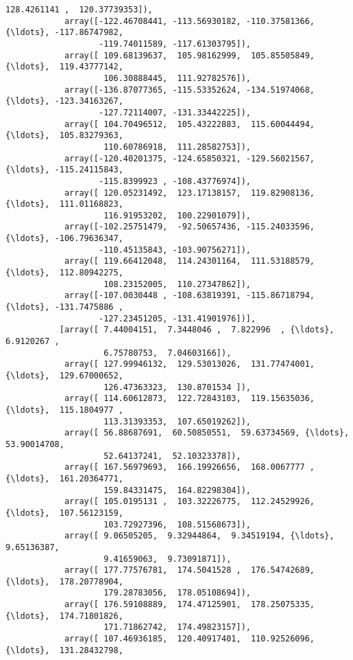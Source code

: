 \documentclass[11pt]{article}
\begin{document}
\begin{Verbatim}[commandchars=\\\{\}]
                    128.4261141 ,  120.37739353]),
            array([-122.46708441, -113.56930182, -110.37581366, {\ldots}, -117.86747982,
                   -119.74011589, -117.61303795]),
            array([ 109.68139637,  105.98162999,  105.85505849, {\ldots},  119.43777142,
                    106.30888445,  111.92782576]),
            array([-136.87077365, -115.53352624, -134.51974068, {\ldots}, -123.34163267,
                   -127.72114007, -131.33442225]),
            array([ 104.70496512,  105.43222883,  115.60044494, {\ldots},  105.83279363,
                    110.60786918,  111.28582753]),
            array([-120.40201375, -124.65850321, -129.56021567, {\ldots}, -115.24115843,
                   -115.8399923 , -108.43776974]),
            array([ 120.05231492,  123.17138157,  119.82908136, {\ldots},  111.01168823,
                    116.91953202,  100.22901079]),
            array([-102.25751479,  -92.50657436, -115.24033596, {\ldots}, -106.79636347,
                   -110.45135843, -103.90756271]),
            array([ 119.66412048,  114.24301164,  111.53188579, {\ldots},  112.80942275,
                    108.23152005,  110.27347862]),
            array([-107.0030448 , -108.63819391, -115.86718794, {\ldots}, -131.7475886 ,
                   -127.23451205, -131.41901976])],
           [array([ 7.44004151,  7.3448046 ,  7.822996  , {\ldots},  6.9120267 ,
                    6.75780753,  7.04603166]),
            array([ 127.99946132,  129.53013026,  131.77474001, {\ldots},  129.67000652,
                    126.47363323,  130.8701534 ]),
            array([ 114.60612873,  122.72843103,  119.15635036, {\ldots},  115.1804977 ,
                    113.31393353,  107.65019262]),
            array([ 56.88687691,  60.50850551,  59.63734569, {\ldots},  53.90014708,
                    52.64137241,  52.10323378]),
            array([ 167.56979693,  166.19926656,  168.0067777 , {\ldots},  161.20364771,
                    159.84331475,  164.82298304]),
            array([ 105.0195131 ,  103.32226775,  112.24529926, {\ldots},  107.56123159,
                    103.72927396,  108.51568673]),
            array([ 9.06505205,  9.32944864,  9.34519194, {\ldots},  9.65136387,
                    9.41659063,  9.73091871]),
            array([ 177.77576781,  174.5041528 ,  176.54742689, {\ldots},  178.20778904,
                    179.28783056,  178.05108694]),
            array([ 176.59108889,  174.47125901,  178.25075335, {\ldots},  174.71801826,
                    171.71862742,  174.49823157]),
            array([ 107.46936185,  120.40917401,  110.92526096, {\ldots},  131.28432798,

\end{Verbatim}
\end{document}
